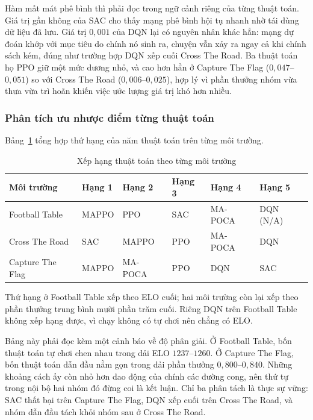 \indent Hàm mất mát phê bình thì phải đọc trong ngữ cảnh riêng của từng thuật toán. Giá
trị gần không của SAC cho thấy mạng phê bình hội tụ nhanh nhờ tái dùng dữ liệu đã lưu. Giá
trị $0{,}001$ của DQN lại có nguyên nhân khác hẳn: mạng dự đoán khớp với mục tiêu do chính nó
sinh ra, chuyện vẫn xảy ra ngay cả khi chính sách kém, đúng như trường hợp DQN xếp
cuối Cross The Road. Ba thuật toán họ PPO giữ một mức dương nhỏ, và cao hơn hẳn ở Capture
The Flag ($0{,}047$--$0{,}051$) so với Cross The Road ($0{,}006$--$0{,}025$), hợp lý vì phần
thưởng nhóm vừa thưa vừa trì hoãn khiến việc ước lượng giá trị khó hơn nhiều.

\subsubsection{Phân tích ưu nhược điểm từng thuật toán}
\indent Bảng~\ref{tab:overall_ranking} tổng hợp thứ hạng của năm thuật toán trên từng
môi trường.

\begin{table}[H]
\centering
\caption{Xếp hạng thuật toán theo từng môi trường}
\label{tab:overall_ranking}
\renewcommand{\arraystretch}{1.35}
\tablefont
\begin{tabular}{|p{2.7cm}|>{\centering\arraybackslash}p{1.95cm}
                |>{\centering\arraybackslash}p{1.95cm}
                |>{\centering\arraybackslash}p{1.95cm}
                |>{\centering\arraybackslash}p{1.95cm}
                |>{\centering\arraybackslash}p{1.95cm}|}
\hline
\textbf{Môi trường} & \textbf{Hạng 1} & \textbf{Hạng 2} & \textbf{Hạng 3} & \textbf{Hạng 4} & \textbf{Hạng 5} \\
\hline
Football Table & MAPPO & PPO & SAC & MA-POCA & DQN (N/A) \\
\hline
Cross The Road & SAC & MAPPO & PPO & MA-POCA & DQN \\
\hline
Capture The Flag & MAPPO & MA-POCA & PPO & DQN & SAC \\
\hline
\end{tabular}
\end{table}

\indent Thứ hạng ở Football Table xếp theo ELO cuối; hai môi trường còn lại xếp theo phần
thưởng trung bình mười phần trăm cuối. Riêng DQN trên Football Table không xếp hạng được,
vì chạy không có tự chơi nên chẳng có ELO.

\indent Bảng này phải đọc kèm một cảnh báo về độ phân giải. Ở Football Table, bốn thuật
toán tự chơi chen nhau trong dải ELO $1237$--$1260$. Ở Capture The Flag, bốn thuật toán
dẫn đầu nằm gọn trong dải phần thưởng $0{,}800$--$0{,}840$. Những khoảng cách ấy còn nhỏ
hơn dao động của chính các đường cong, nên thứ tự trong nội bộ hai nhóm đó đừng coi là kết
luận. Chỉ ba phân tách là thực sự vững: SAC thất bại trên Capture The Flag, DQN xếp cuối
trên Cross The Road, và nhóm dẫn đầu tách khỏi nhóm sau ở Cross The Road.

